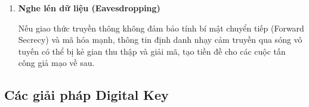 \begin{enumerate}
    Đối với các hệ thống có không gian khóa nhỏ hoặc không giới hạn tốc độ thử, kẻ tấn công có thể dò tìm mã khóa (Brute Force). Ngoài ra, sự phổ biến của các thiết bị phần cứng mã nguồn mở như Proxmark3 hay Flipper Zero cho phép sao chép dễ dàng các thẻ từ (RFID) hoặc Key Fob có độ bảo mật thấp.
    
    \item \textbf{Nghe lén dữ liệu (Eavesdropping)}
    
    Nếu giao thức truyền thông không đảm bảo tính bí mật chuyển tiếp (Forward Secrecy) và mã hóa mạnh, thông tin định danh nhạy cảm truyền qua sóng vô tuyến có thể bị kẻ gian thu thập và giải mã, tạo tiền đề cho các cuộc tấn công giả mạo về sau.
\end{enumerate}


\subsection{Các giải pháp Digital Key}

